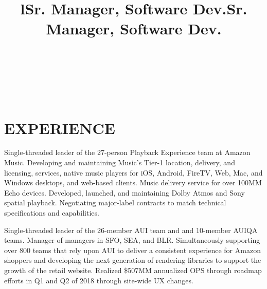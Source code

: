 \documentclass[margin]{res}
\begin{document}
\bigskip

\address{2528 Chilton Way\\ken@hero.net}
\address{Berkeley, CA 94704\\(310) 383-7981}

\begin{resume}

\begin{format}
\title{l}\\
\\
\body\\
\end{format}

\section{EXPERIENCE}

\title{\textbf{Sr. Manager, Software Dev.}}
\begin{position}
\hspace*{.5cm}Single-threaded leader of the 27-person Playback Experience team at Amazon Music. Developing and maintaining Music's Tier-1 location, delivery, and licensing, services, native music players for iOS, Android, FireTV, Web, Mac, and Windows desktops, and web-based clients. Music delivery service for over 100MM Echo devices. Developed, launched, and maintaining Dolby Atmos and Sony spatial playback. Negotiating major-label contracts to match technical specifications and capabilities.
\end{position}

\title{\textbf{Sr. Manager, Software Dev.}}
\begin{position}
\hspace*{.5cm}Single-threaded leader of the 26-member AUI team and and 10-member AUIQA teams. Manager of managers in SFO, SEA, and BLR. Simultaneously supporting over 800 teams that rely upon AUI to deliver a consistent experience for Amazon shoppers and developing the next generation of rendering libraries to support the growth of the retail website. Realized \$507MM annualized OPS through roadmap efforts in Q1 and Q2 of 2018 through site-wide UX changes.
\end{position}


\end{resume}
\end{document}
